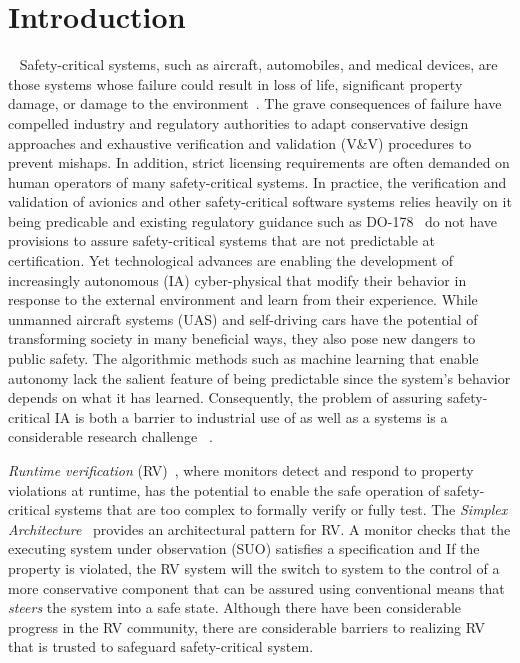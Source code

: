 \section{Introduction}~\label{sec:intro} 
Safety-critical systems, such as aircraft, automobiles, and medical
devices, are those systems whose failure could result
in loss of life, significant property damage, or damage to the
environment~\cite{Knight2002}.  The  grave consequences of failure have compelled
industry and regulatory authorities  to adapt conservative design
approaches and exhaustive verification and validation (V\&V) procedures
to prevent mishaps. In addition, strict licensing requirements are
often demanded on human operators of  many safety-critical systems.
In practice, the verification and validation of avionics
and other safety-critical software systems relies heavily on it being
predicable and existing regulatory guidance  such as
DO-178~\cite{DO178B}  do not  have provisions to
assure safety-critical systems that are not predictable at certification. 
Yet technological advances are enabling the development of increasingly
autonomous (IA) cyber-physical  that modify their behavior in response
to the external environment and learn from their experience.  While
unmanned aircraft systems (UAS) and self-driving cars have the
potential of transforming society in many beneficial ways, they also
pose new dangers to public safety. The algorithmic methods such as
machine learning that enable autonomy lack the salient feature of
being predictable since the system's behavior depends on what it has
learned.  Consequently, the  problem  of assuring safety-critical IA is
both a barrier to industrial use of  as well as a 
systems is a considerable research challenge~\cite{NRC14} .


\emph{Runtime verification} (RV)~\cite{monitors}, where monitors
detect and respond to property violations at runtime, has the
potential to enable the safe operation of safety-critical systems that
are too complex to formally verify or fully test. The \emph{Simplex
  Architecture}~\cite{simplex} provides an architectural pattern for
RV. A monitor checks that the executing system under observation (SUO)
satisfies a specification and If the property is violated, the RV
system will the switch to system to the control of a more conservative
component that can be assured using conventional means that
\emph{steers} the system into a safe state. Although there have been
considerable progress in the RV community,  there are considerable
barriers to realizing  RV that is trusted to safeguard safety-critical
system. 

